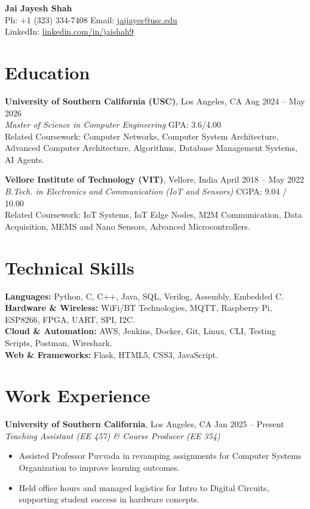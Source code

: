 \documentclass[letterpaper,10pt]{article}
\begin{document}
\begin{center}
    {\LARGE \textbf{Jai Jayesh Shah}} \\
    \vspace{5pt}
    \small
    Ph: +1 (323) 334-7408 \quad Email: \href{mailto:jaijayes@usc.edu}{jaijayes@usc.edu} \\
    LinkedIn: \href{https://www.linkedin.com/in/jaishah9}{linkedin.com/in/jaishah9} \\
    \vspace{-8pt}
\end{center}

\section*{Education}
\textbf{University of Southern California (USC)}, Los Angeles, CA \hfill Aug 2024 -- May 2026 \\
\textit{Master of Science in Computer Engineering} \hfill GPA: 3.6/4.00 \\
Related Coursework: Computer Networks, Computer System Architecture, Advanced Computer Architecture, Algorithms, Database Management Systems, AI Agents.

\textbf{Vellore Institute of Technology (VIT)}, Vellore, India \hfill April 2018 -- May 2022 \\
\textit{B.Tech. in Electronics and Communication (IoT and Sensors)} \hfill CGPA: 9.04 / 10.00 \\
Related Coursework: IoT Systems, IoT Edge Nodes, M2M Communication, Data Acquisition, MEMS and Nano Sensors, Advanced Microcontrollers.

\section*{Technical Skills}
\textbf{Languages:} Python, C, C++, Java, SQL, Verilog, Assembly, Embedded C. \\
\textbf{Hardware \& Wireless:} WiFi/BT Technologies, MQTT, Raspberry Pi, ESP8266, FPGA, UART, SPI, I2C. \\
\textbf{Cloud \& Automation:} AWS, Jenkins, Docker, Git, Linux, CLI, Testing Scripts, Postman, Wireshark. \\
\textbf{Web \& Frameworks:} Flask, HTML5, CSS3, JavaScript.

\section*{Work Experience}
\textbf{University of Southern California}, Los Angeles, CA \hfill Jan 2025 -- Present \\
\textit{Teaching Assistant (EE 457) \& Course Producer (EE 354)}
\begin{itemize}
    \item Assisted Professor Puvvada in revamping assignments for Computer Systems Organization to improve learning outcomes.
    \item Held office hours and managed logistics for Intro to Digital Circuits, supporting student success in hardware concepts.
\end{itemize}
\end{document}
